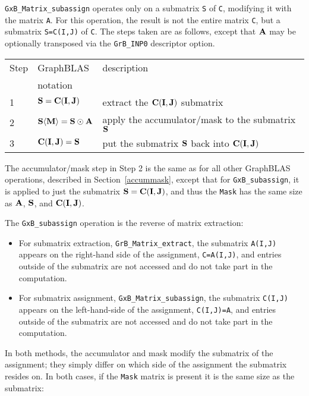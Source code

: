 \documentclass[12pt]{article}
\begin{document}
\verb'GxB_Matrix_subassign' operates only on a submatrix \verb'S' of \verb'C',
modifying it with the matrix \verb'A'.   For this operation, the result is not
the entire matrix \verb'C', but a submatrix \verb'S=C(I,J)' of \verb'C'.  The
steps taken are as follows, except that ${\bf A}$ may be optionally transposed
via the \verb'GrB_INP0' descriptor option.

\vspace{0.1in}
\begin{tabular}{lll}
\hline
Step & GraphBLAS & description \\
     & notation  & \\
\hline
1 & ${\bf S} = {\bf C(I,J)}$                             & extract the ${\bf C(I,J)}$ submatrix \\
2 & ${\bf S \langle M \rangle} = {\bf S} \odot {\bf A}$  & apply the accumulator/mask to the submatrix ${\bf S}$\\
3 & ${\bf C(I,J)}= {\bf S}$                              & put the submatrix ${\bf S}$ back into ${\bf C(I,J)}$ \\
\hline
\end{tabular}
\vspace{0.1in}

The accumulator/mask step in Step 2 is the same as for all other GraphBLAS
operations, described in Section~\ref{accummask}, except that for
\verb'GxB_subassign', it is applied to just the submatrix ${\bf S} = {\bf
C(I,J)}$, and thus the \verb'Mask' has the same size as ${\bf A}$,
${\bf S}$, and ${\bf C(I,J)}$.

The \verb'GxB_subassign' operation is the reverse of matrix extraction:

\begin{itemize}
\item
For submatrix extraction, \verb'GrB_Matrix_extract',
the submatrix \verb'A(I,J)' appears on the right-hand side of the assignment,
\verb'C=A(I,J)', and entries outside of the submatrix are not accessed and do
not take part in the computation.

\item
For submatrix assignment, \verb'GxB_Matrix_subassign',
the submatrix \verb'C(I,J)' appears on the left-hand-side of the assignment,
\verb'C(I,J)=A', and entries outside of the submatrix are not accessed and do
not take part in the computation.

\end{itemize}

In both methods, the accumulator and mask modify the submatrix of the
assignment; they simply differ on which side of the assignment the submatrix
resides on.  In both cases, if the \verb'Mask' matrix is present it is the same
size as the submatrix:
\end{document}
